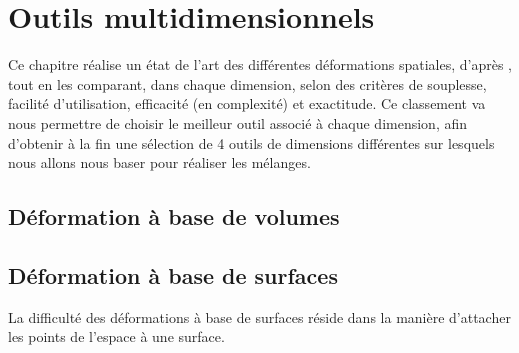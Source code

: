 
\chapter{Outils multidimensionnels}

\graphicspath{{Chapter1/Chapter1Figs/PNG/}{Chapter1/Chapter1Figs/PDF/}{Chapter1/Chapter1Figs/}}

Ce chapitre réalise un état de l'art des différentes déformations
spatiales, d'après \cite{GB08}, tout en les comparant, dans chaque
dimension, selon des critères de souplesse, facilité d'utilisation,
efficacité (en complexité) et exactitude. Ce classement va nous
permettre de choisir le meilleur outil associé à chaque dimension,
afin d'obtenir à la fin une sélection de 4 outils de dimensions
différentes sur lesquels nous allons nous baser pour réaliser les
mélanges.

\section{Déformation à base de volumes}

\section{Déformation à base de surfaces}
La difficulté des déformations à base de surfaces réside dans la
manière d'attacher les points de l'espace à une surface.


